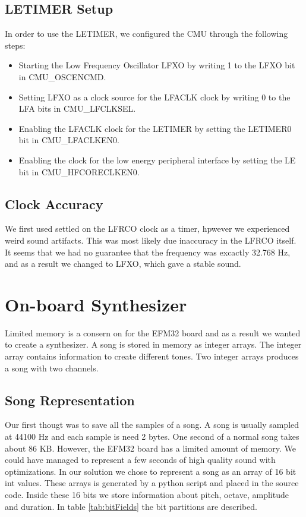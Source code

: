 \subsection{LETIMER Setup}
In order to use the LETIMER, we configured the CMU through the following steps:
\begin{itemize}
  \item Starting the Low Frequency Oscillator LFXO by writing 1 to the LFXO bit in CMU\_OSCENCMD.
  \item Setting LFXO as a clock source for the LFACLK clock by writing 0 to the LFA bits in CMU\_LFCLKSEL.
  \item Enabling the LFACLK clock for the LETIMER by setting the LETIMER0 bit in CMU\_LFACLKEN0.
  \item Enabling the clock for the low energy peripheral interface by setting the LE bit in CMU\_HFCORECLKEN0.
\end{itemize}

\subsection{Clock Accuracy}
We first used settled on the LFRCO clock as a timer, hpwever we experienced weird sound artifacts. This was most likely due inaccuracy in the LFRCO itself. It seems that we had no guarantee that the frequency was excactly 32.768 Hz, and as a result we changed to LFXO, which gave a stable sound.

\section{On-board Synthesizer}\label{sec:onboard-synthesizer}
Limited memory is a consern on for the EFM32 board and as a result we wanted to create a synthesizer. A song is stored in memory as integer arrays. The integer array contains information to create different tones. Two integer arrays produces a song with two channels.

\subsection{Song Representation}
Our first thougt was to save all the samples of a song. A song is usually sampled at 44100 Hz and each sample is need 2 bytes. One second of a normal song takes about 86 KB. However, the EFM32 board has a limited amount of memory. We could have managed to represent a few seconds of high quality sound with optimizations. In our solution we chose to represent a song as an array of 16 bit int values. These arrays is generated by a python script and placed in the source code. Inside these 16 bits we store information about pitch, octave, amplitude and duration. In table \ref{tab:bitFields} the bit partitions are described.

